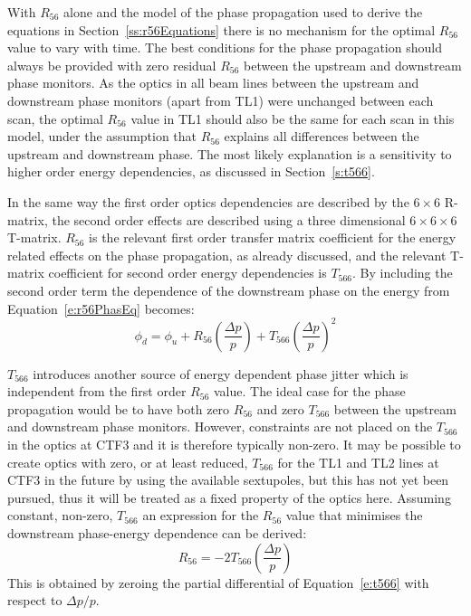 With \(R_{56}\) alone and the model of the phase propagation used to derive the equations in Section~\ref{ss:r56Equations} there is no mechanism for the optimal \(R_{56}\) value to vary with time. The best conditions for the phase propagation should always be provided with zero residual \(R_{56}\) between the upstream and downstream phase monitors. As the optics in all beam lines between the upstream and downstream phase monitors (apart from TL1) were unchanged between each scan, the optimal \(R_{56}\) value in TL1 should also be the same for each scan in this model, under the assumption that \(R_{56}\) explains all differences between the upstream and downstream phase. The most likely explanation is a sensitivity to higher order energy dependencies, as discussed in Section~\ref{s:t566}.


In the same way the first order optics dependencies are described by the \(6 \times 6\) R-matrix, the second order effects are described using a three dimensional \(6 \times 6 \times 6\) T-matrix. \(R_{56}\) is the relevant first order transfer matrix coefficient for the energy related effects on the phase propagation, as already discussed, and the relevant T-matrix coefficient for second order energy dependencies is \(T_{566}\). By including the second order term the dependence of the downstream phase on the energy from Equation~\ref{e:r56PhasEq} becomes:
\begin{equation}
\phi_d = \phi_u + R_{56}\left(\frac{\Delta p}{p}\right) + T_{566}\left(\frac{\Delta p}{p}\right)^2
\label{e:t566}
\end{equation}

\(T_{566}\) introduces another source of energy dependent phase jitter which is independent from the first order \(R_{56}\) value. The ideal case for the phase propagation would be to have both zero \(R_{56}\) and zero \(T_{566}\) between the upstream and downstream phase monitors. However, constraints are not placed on the \(T_{566}\) in the optics at CTF3 and it is therefore typically non-zero. It may be possible to create optics with zero, or at least reduced, \(T_{566}\) for the TL1 and TL2 lines at CTF3 in the future by using the available sextupoles, but this has not yet been pursued, thus it will be treated as a fixed property of the optics here. Assuming constant, non-zero, \(T_{566}\) an expression for the \(R_{56}\) value that minimises the downstream phase-energy dependence can be derived:
\begin{equation}
R_{56} = -2T_{566} \left(\frac{\Delta p}{p}\right)
\label{e:r56t566dep}
\end{equation}
This is obtained by zeroing the partial differential of Equation~\ref{e:t566} with respect to \(\Delta p/p\).

